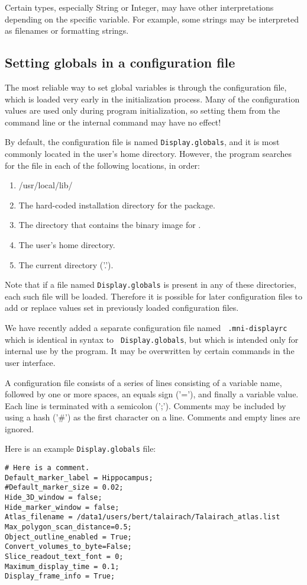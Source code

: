 Certain types, especially String or Integer, may have other
interpretations depending on the specific variable. For example, some
strings may be interpreted as filenames or formatting strings.

\subsection{Setting globals in a configuration file}
The most reliable way to set global variables is through the configuration file, which is loaded very early in the initialization process. Many of the configuration values are used only during program initialization, so setting them from the command line or the internal command may have no effect!

By default, the configuration file is named {\tt Display.globals}, and
it is most commonly located in the user's home directory. However, the 
program searches for the file in each of the following locations, in order:
\begin{enumerate}
\item /usr/local/lib/
\item The hard-coded installation directory for the package.
\item The directory that contains the binary image for \display.
\item The user's home directory.
\item The current directory ('.').
\end{enumerate}

Note that if a file named {\tt Display.globals} is present in any of these
directories, each such file will be loaded. Therefore it is possible
for later configuration files to add or replace values set in
previously loaded configuration files.

We have recently added a separate configuration file named {\tt
  .mni-displayrc} which is identical in syntax to {\tt
  Display.globals}, but which is intended only for internal use by the
program. It may be overwritten by certain commands in the user interface.

A configuration file consists of a series of lines consisting of a
variable name, followed by one or more spaces, an equals sign ('='),
and finally a variable value. Each line is terminated with a semicolon
(';'). Comments may be included by using a hash ('\#') as the first character
on a line. Comments and empty lines are ignored.

Here is an example {\tt Display.globals} file:
\begin{verbatim}
# Here is a comment.
Default_marker_label = Hippocampus;
#Default_marker_size = 0.02;
Hide_3D_window = false;
Hide_marker_window = false;
Atlas_filename = /data1/users/bert/talairach/Talairach_atlas.list
Max_polygon_scan_distance=0.5;
Object_outline_enabled = True;
Convert_volumes_to_byte=False;
Slice_readout_text_font = 0;
Maximum_display_time = 0.1;
Display_frame_info = True;
\end{verbatim}


